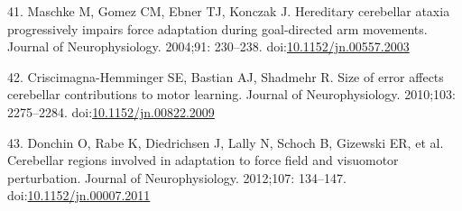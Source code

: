 \documentclass[10pt,letterpaper]{article}
\begin{document}
\hypertarget{ref-Maschke2004}{}
41. Maschke M, Gomez CM, Ebner TJ, Konczak J. Hereditary cerebellar
ataxia progressively impairs force adaptation during goal-directed arm
movements. Journal of Neurophysiology. 2004;91: 230--238.
doi:\href{https://doi.org/10.1152/jn.00557.2003}{10.1152/jn.00557.2003}

\hypertarget{ref-Criscimagna-Hemminger2010}{}
42. Criscimagna-Hemminger SE, Bastian AJ, Shadmehr R. Size of error
affects cerebellar contributions to motor learning. Journal of
Neurophysiology. 2010;103: 2275--2284.
doi:\href{https://doi.org/10.1152/jn.00822.2009}{10.1152/jn.00822.2009}

\hypertarget{ref-Donchin2012}{}
43. Donchin O, Rabe K, Diedrichsen J, Lally N, Schoch B, Gizewski ER, et
al. Cerebellar regions involved in adaptation to force field and
visuomotor perturbation. Journal of Neurophysiology. 2012;107: 134--147.
doi:\href{https://doi.org/10.1152/jn.00007.2011}{10.1152/jn.00007.2011}

\nolinenumbers
\end{document}
